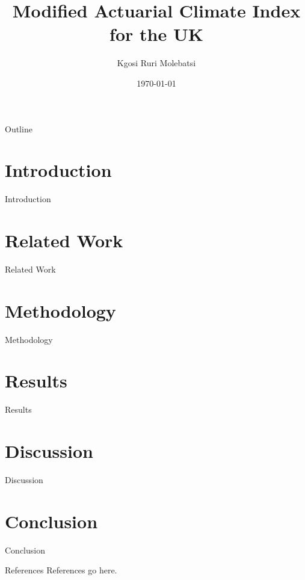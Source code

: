 \documentclass{beamer}
\title{Modified Actuarial Climate Index for the UK}
\author{Kgosi Ruri Molebatsi}
\institute{Heriot-Watt University, Edinburgh}
\date{\today}
\begin{document}
\begin{frame}
    \titlepage
\end{frame}

\begin{frame}{Outline}
    \tableofcontents
\end{frame}

\section{Introduction}
\begin{frame}{Introduction}
\end{frame}

\section{Related Work}
\begin{frame}{Related Work}
\end{frame}

\section{Methodology}
\begin{frame}{Methodology}
\end{frame}

\section{Results}
\begin{frame}{Results}
\end{frame}

\section{Discussion}
\begin{frame}{Discussion}
\end{frame}

\section{Conclusion}
\begin{frame}{Conclusion}
\end{frame}

\begin{frame}{References}
    References go here.
\end{frame}
\end{document}

